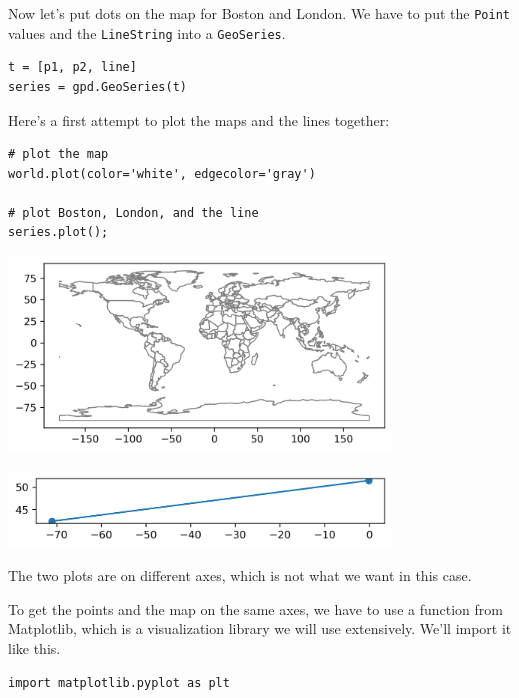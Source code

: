 Now let's put dots on the map for Boston and London. We have to put the
\passthrough{\lstinline!Point!} values and the
\passthrough{\lstinline!LineString!} into a
\passthrough{\lstinline!GeoSeries!}.

\begin{lstlisting}[]
t = [p1, p2, line]
series = gpd.GeoSeries(t)
\end{lstlisting}

Here's a first attempt to plot the maps and the lines together:

\begin{lstlisting}[]
# plot the map
world.plot(color='white', edgecolor='gray')

# plot Boston, London, and the line
series.plot();
\end{lstlisting}

\begin{center}
\includegraphics[width=4in]{chapters/02_times_files/02_times_126_0.png}
\end{center}

\begin{center}
\includegraphics[width=4in]{chapters/02_times_files/02_times_126_1.png}
\end{center}

The two plots are on different axes, which is not what we want in this
case.

To get the points and the map on the same axes, we have to use a
function from Matplotlib, which is a visualization library we will use
extensively. We'll import it like this.

\begin{lstlisting}[]
import matplotlib.pyplot as plt
\end{lstlisting}

